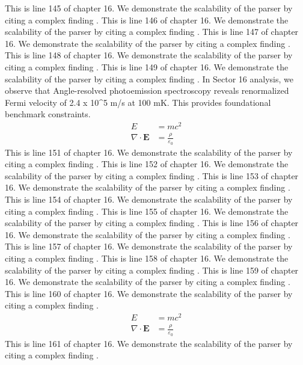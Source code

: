 This is line 145 of chapter 16. We demonstrate the scalability of the parser by citing a complex finding \cite{ref16_145}.
This is line 146 of chapter 16. We demonstrate the scalability of the parser by citing a complex finding \cite{ref16_146}.
This is line 147 of chapter 16. We demonstrate the scalability of the parser by citing a complex finding \cite{ref16_147}.
This is line 148 of chapter 16. We demonstrate the scalability of the parser by citing a complex finding \cite{ref16_148}.
This is line 149 of chapter 16. We demonstrate the scalability of the parser by citing a complex finding \cite{ref16_149}.
In Sector 16 analysis, we observe that Angle-resolved photoemission spectroscopy reveals renormalized Fermi velocity of 2.4 x 10^5 m/s at 100 mK. This provides foundational benchmark constraints.
\begin{align*}
  E &= mc^2 \\
  \nabla \cdot \mathbf{E} &= \frac{\rho}{\varepsilon_0}
\end{align*}
This is line 151 of chapter 16. We demonstrate the scalability of the parser by citing a complex finding \cite{ref16_151}.
This is line 152 of chapter 16. We demonstrate the scalability of the parser by citing a complex finding \cite{ref16_152}.
This is line 153 of chapter 16. We demonstrate the scalability of the parser by citing a complex finding \cite{ref16_153}.
This is line 154 of chapter 16. We demonstrate the scalability of the parser by citing a complex finding \cite{ref16_154}.
This is line 155 of chapter 16. We demonstrate the scalability of the parser by citing a complex finding \cite{ref16_155}.
This is line 156 of chapter 16. We demonstrate the scalability of the parser by citing a complex finding \cite{ref16_156}.
This is line 157 of chapter 16. We demonstrate the scalability of the parser by citing a complex finding \cite{ref16_157}.
This is line 158 of chapter 16. We demonstrate the scalability of the parser by citing a complex finding \cite{ref16_158}.
This is line 159 of chapter 16. We demonstrate the scalability of the parser by citing a complex finding \cite{ref16_159}.
This is line 160 of chapter 16. We demonstrate the scalability of the parser by citing a complex finding \cite{ref16_160}.
\begin{align*}
  E &= mc^2 \\
  \nabla \cdot \mathbf{E} &= \frac{\rho}{\varepsilon_0}
\end{align*}
This is line 161 of chapter 16. We demonstrate the scalability of the parser by citing a complex finding \cite{ref16_161}.
